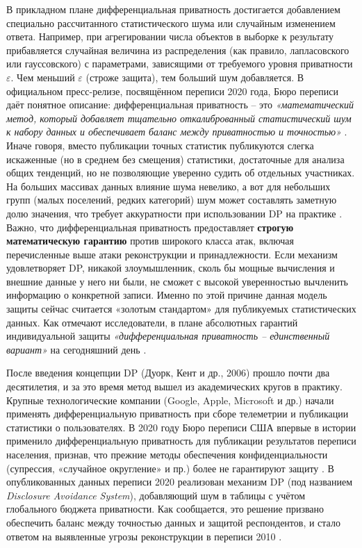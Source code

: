 В прикладном плане дифференциальная приватность достигается
добавлением специально рассчитанного статистического шума или случайным изменением ответа. Например, при агрегировании
числа объектов в выборке к результату прибавляется случайная величина из распределения (как правило, лапласовского или
гауссовского) с параметрами, зависящими от требуемого уровня приватности $\varepsilon$. Чем меньший $\varepsilon$
(строже защита), тем больший шум добавляется. В официальном пресс-релизе, посвящённом переписи 2020 года, Бюро переписи
даёт понятное описание: дифференциальная приватность – это \textit{«математический метод, который добавляет тщательно
откалиброванный статистический шум к набору данных и обеспечивает баланс между приватностью и точностью»}
\autocite{census-gov}. Иначе говоря, вместо публикации точных статистик публикуются слегка искаженные (но в среднем без
смещения) статистики, достаточные для анализа общих тенденций, но не позволяющие уверенно судить об отдельных
участниках. На больших массивах данных влияние шума невелико, а вот для небольших групп (малых поселений, редких
категорий) шум может составлять заметную долю значения, что требует аккуратности при использовании DP на практике
\autocite{cornell-edu}. Важно, что дифференциальная приватность предоставляет \textbf{строгую математическую гарантию}
против широкого класса атак, включая перечисленные выше атаки реконструкции и принадлежности. Если механизм
удовлетворяет DP, никакой злоумышленник, сколь бы мощные вычисления и внешние данные у него ни были, не сможет с высокой
уверенностью вычленить информацию о конкретной записи. Именно по этой причине данная модель защиты сейчас считается
«золотым стандартом» для публикуемых статистических данных. Как отмечают исследователи, в плане абсолютных гарантий
индивидуальной защиты \textit{«дифференциальная приватность – единственный вариант»} на сегодняшний день
\autocite{cornell-edu}.

После введения концепции DP (Дуорк, Кент и др., 2006) прошло почти два десятилетия, и за это
время метод вышел из академических кругов в практику. Крупные технологические компании (Google, Apple, Microsoft и др.)
начали применять дифференциальную приватность при сборе телеметрии и публикации статистики о пользователях. В 2020 году
Бюро переписи США впервые в истории применило дифференциальную приватность для публикации результатов переписи
населения, признав, что прежние методы обеспечения конфиденциальности (супрессия, «случайное округление» и пр.) более не
гарантируют защиту \autocite{cornell-edu}. В опубликованных данных переписи 2020 реализован механизм DP (под названием
\textit{Disclosure Avoidance System}), добавляющий шум в таблицы с учётом глобального бюджета приватности. Как
сообщается, это решение призвано обеспечить баланс между точностью данных и защитой респондентов, и стало ответом на
выявленные угрозы реконструкции в переписи 2010 \autocite{census-gov} \autocite{cornell-edu}.

